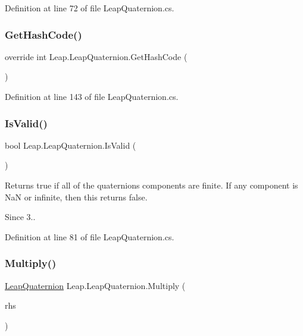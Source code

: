 Definition at line 72 of file Leap\+Quaternion.\+cs.

\mbox{\label{struct_leap_1_1_leap_quaternion_afef4eb69b6fb088f513d8ea9d45331e5}} 
\subsubsection{\texorpdfstring{GetHashCode()}{GetHashCode()}}
{\footnotesize\ttfamily override int Leap.\+Leap\+Quaternion.\+Get\+Hash\+Code (\begin{DoxyParamCaption}{ }\end{DoxyParamCaption})}



Definition at line 143 of file Leap\+Quaternion.\+cs.

\mbox{\label{struct_leap_1_1_leap_quaternion_ad55818738b16d017e907cb9ac9fc975f}} 
\subsubsection{\texorpdfstring{IsValid()}{IsValid()}}
{\footnotesize\ttfamily bool Leap.\+Leap\+Quaternion.\+Is\+Valid (\begin{DoxyParamCaption}{ }\end{DoxyParamCaption})}



Returns true if all of the quaternion\textquotesingle{}s components are finite. If any component is NaN or infinite, then this returns false. 

\begin{DoxySince}{Since}
3.. 
\end{DoxySince}


Definition at line 81 of file Leap\+Quaternion.\+cs.

\mbox{\label{struct_leap_1_1_leap_quaternion_a19295cb26ceaa4f798ee093af641c1de}} 
\subsubsection{\texorpdfstring{Multiply()}{Multiply()}}
{\footnotesize\ttfamily \mbox{\hyperlink{struct_leap_1_1_leap_quaternion}{Leap\+Quaternion}} Leap.\+Leap\+Quaternion.\+Multiply (\begin{DoxyParamCaption}\item[{\mbox{\hyperlink{struct_leap_1_1_leap_quaternion}{Leap\+Quaternion}}}]{rhs }\end{DoxyParamCaption})}



